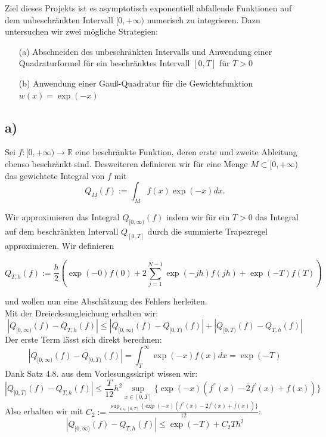 

Ziel dieses Projekts ist es asymptotisch exponentiell abfallende Funktionen auf dem unbeschränkten Intervall $[0, +\infty)$ numerisch zu integrieren. Dazu untersuchen wir zwei mögliche Strategien:

\begin{itemize}
    \item[(a)] Abschneiden des unbeschränkten Intervalls und Anwendung einer Quadraturformel für ein beschränktes Intervall $[0, T]$ für $T > 0$

    \item[(b)] Anwendung einer Gauß-Quadratur für die Gewichtsfunktion $w(x) = \exp(-x)$
\end{itemize}


\label{listing:1}


\subsection*{a)}
Sei $f: [0,+\infty) \rightarrow \mathbb{R}$ eine beschränkte Funktion, deren erste und zweite Ableitung ebenso beschränkt sind. Desweiteren definieren wir für eine Menge $M \subset [0,+\infty)$ das gewichtete Integral von $f$ mit
\[Q_M(f) := \int_M f(x)\exp(-x) dx.\]

Wir approximieren das Integral $Q_{[0,\infty)}(f)$ indem wir für ein $T > 0$ das Integral auf dem beschränkten Intervall $Q_{[0,T]}$ durch die summierte Trapezregel approximieren. 
Wir definieren

$$Q_{T,h}(f) := \frac{h}{2}\left(\exp(-0)f(0) + 2\sum_{j=1}^{N-1}\exp(-jh)f(jh)+\exp(-T)f(T)\right)$$

und wollen nun eine Abschätzung des Fehlers herleiten.\\
Mit der Dreiecksungleichung erhalten wir:
\begin{equation*}
    |Q_{[0,\infty)}(f) - Q_{T,h}(f)| \leq |Q_{[0,\infty)}(f) - Q_{[0,T)}(f)| + |Q_{[0,T)}(f) - Q_{T,h}(f)|
\end{equation*}
Der erste Term lässt sich direkt berechnen:
\begin{equation*}
    |Q_{[0,\infty)}(f) - Q_{[0,T)}(f)| = \int_{T}^{\infty}\exp(-x)f(x)dx = \exp(-T)
\end{equation*}
Dank Satz 4.8. aus dem Vorlesungsskript wissen wir:
\begin{equation*}
    |Q_{[0,T)}(f) - Q_{T,h}(f)| \leq \frac{T}{12}h^2 \sup_{x\in[0,T]}\{\exp(-x)( f^{''}(x)-2f^{'}(x)+f(x))\}
\end{equation*}
Also erhalten wir mit $C_2 := \frac{\sup_{x\in[0,T]}\{\exp(-x)( f^{''}(x)-2f^{'}(x)+f(x))\}}{12}$:
\begin{equation*}
    |Q_{[0,\infty)}(f) - Q_{T,h}(f)| \leq \exp(-T) + C_2Th^2
\end{equation*}

